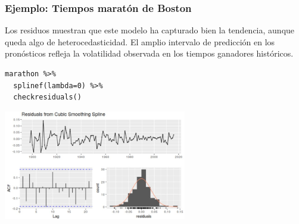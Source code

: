 \documentclass[10pt]{beamer}
\begin{document}
\begin{frame}[fragile]
\frametitle{Ejemplo: Tiempos maratón de Boston}


\small Los residuos muestran que este modelo ha capturado bien la tendencia, aunque queda algo de heterocedasticidad. El amplio intervalo de predicción en los pronósticos refleja la volatilidad observada en los tiempos ganadores históricos.



\lstset{language=r,label= ,caption= ,captionpos=b,numbers=none}
\begin{lstlisting}
marathon %>%
  splinef(lambda=0) %>%
  checkresiduals()
\end{lstlisting}

\pause

\begin{center}
\includegraphics[width=0.60\textwidth]{resSpline.JPG}
\end{center} 



\end{frame}

































\end{document}
